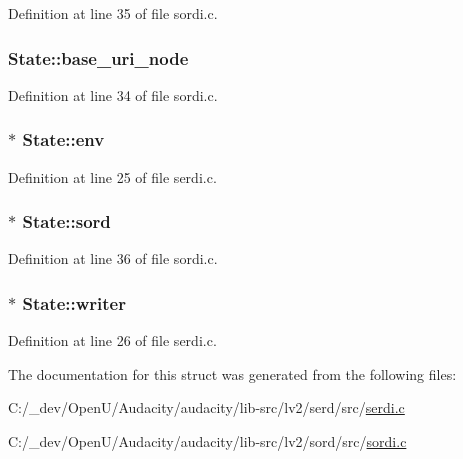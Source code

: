 Definition at line 35 of file sordi.\+c.

\subsubsection[{\texorpdfstring{base\+\_\+uri\+\_\+node}{base_uri_node}}]{ State\+::base\+\_\+uri\+\_\+node}\hypertarget{struct_state_ae1d0266d8239ebbf0f97946a2a9b65fb}{}\label{struct_state_ae1d0266d8239ebbf0f97946a2a9b65fb}


Definition at line 34 of file sordi.\+c.

\subsubsection[{\texorpdfstring{env}{env}}]{ $\ast$ State\+::env}\hypertarget{struct_state_a9d1ce97fbd434a5c76816dd3cea68397}{}\label{struct_state_a9d1ce97fbd434a5c76816dd3cea68397}


Definition at line 25 of file serdi.\+c.

\subsubsection[{\texorpdfstring{sord}{sord}}]{$\ast$ State\+::sord}\hypertarget{struct_state_a97ed8f5f8527bb8a27b3de4b659ed41e}{}\label{struct_state_a97ed8f5f8527bb8a27b3de4b659ed41e}


Definition at line 36 of file sordi.\+c.

\subsubsection[{\texorpdfstring{writer}{writer}}]{ $\ast$ State\+::writer}\hypertarget{struct_state_a65a95a4226135799bf09a1fe88517c5d}{}\label{struct_state_a65a95a4226135799bf09a1fe88517c5d}


Definition at line 26 of file serdi.\+c.



The documentation for this struct was generated from the following files\+:\begin{DoxyCompactItemize}
\item 
C\+:/\+\_\+dev/\+Open\+U/\+Audacity/audacity/lib-\/src/lv2/serd/src/\hyperlink{serdi_8c}{serdi.\+c}\item 
C\+:/\+\_\+dev/\+Open\+U/\+Audacity/audacity/lib-\/src/lv2/sord/src/\hyperlink{sordi_8c}{sordi.\+c}\end{DoxyCompactItemize}
